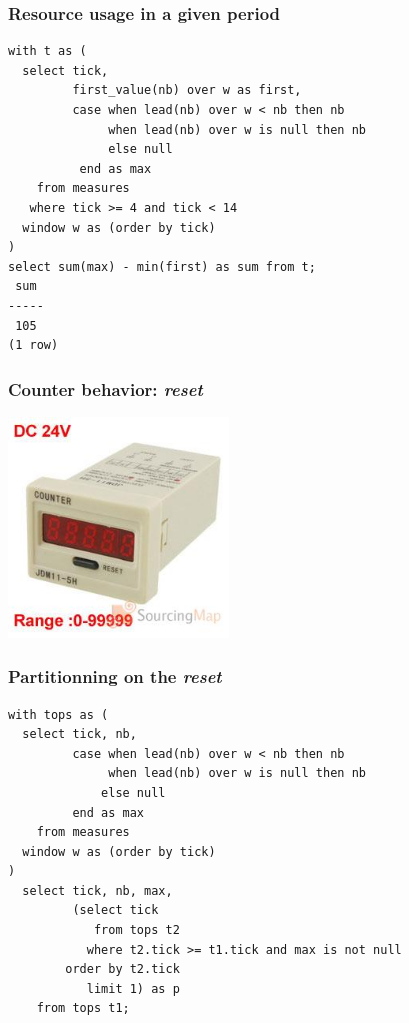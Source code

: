 \documentclass{beamer}
\begin{document}
\begin{frame}[fragile]
  \frametitle{Resource usage in a given period}

\begin{verbatim}
with t as (
  select tick,
         first_value(nb) over w as first,
         case when lead(nb) over w < nb then nb
              when lead(nb) over w is null then nb
              else null
          end as max
    from measures
   where tick >= 4 and tick < 14
  window w as (order by tick)
)
select sum(max) - min(first) as sum from t;
 sum 
-----
 105
(1 row)
\end{verbatim}
\end{frame}

\begin{frame}[fragile]
  \frametitle{Counter behavior: \textit{reset}}

  \begin{center}
    \includegraphics[height=2.3in]{reset-elect.jpg}
  \end{center}
  
\end{frame}

\begin{frame}[fragile]
  \frametitle{Partitionning on the \textit{reset}}

\begin{verbatim}
with tops as (
  select tick, nb,
         case when lead(nb) over w < nb then nb
              when lead(nb) over w is null then nb
             else null
         end as max
    from measures
  window w as (order by tick)
)
  select tick, nb, max,
         (select tick
            from tops t2
           where t2.tick >= t1.tick and max is not null
        order by t2.tick
           limit 1) as p
    from tops t1;
\end{verbatim}
\end{frame}
\end{document}
